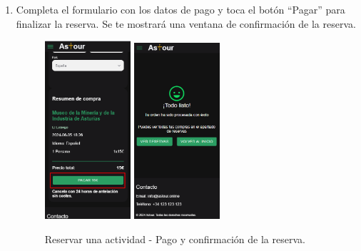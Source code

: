\begin{enumerate}
	\item Completa el formulario con los datos de pago y toca el botón “Pagar” para finalizar la reserva.
	      Se te mostrará una ventana de confirmación de la reserva.
	      \begin{figure}[H]
		      \centering
		      \includegraphics[width=0.3\textwidth]{7-Construccion/Manuales/mobile/pagar.png}
		      \includegraphics[width=0.3\textwidth]{7-Construccion/Manuales/mobile/confirmacion.png}
		      \caption{Reservar una actividad - Pago y confirmación de la reserva.}
	      \end{figure}
\end{enumerate}

